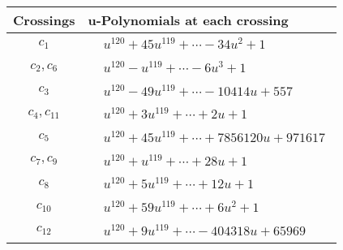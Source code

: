 \documentclass[1p]{elsarticle_modified}
\theoremstyle{definition}
\begin{document}
\begin{tabular}{m{50pt}|m{274pt}}
Crossings & \hspace{64pt}u-Polynomials at each crossing \\
\hline $$\begin{aligned}c_{1}\end{aligned}$$&$\begin{aligned}
&u^{120}+45 u^{119}+\cdots-34 u^2+1
\end{aligned}$\\
\hline $$\begin{aligned}c_{2},c_{6}\end{aligned}$$&$\begin{aligned}
&u^{120}- u^{119}+\cdots-6 u^3+1
\end{aligned}$\\
\hline $$\begin{aligned}c_{3}\end{aligned}$$&$\begin{aligned}
&u^{120}-49 u^{119}+\cdots-10414 u+557
\end{aligned}$\\
\hline $$\begin{aligned}c_{4},c_{11}\end{aligned}$$&$\begin{aligned}
&u^{120}+3 u^{119}+\cdots+2 u+1
\end{aligned}$\\
\hline $$\begin{aligned}c_{5}\end{aligned}$$&$\begin{aligned}
&u^{120}+45 u^{119}+\cdots+7856120 u+971617
\end{aligned}$\\
\hline $$\begin{aligned}c_{7},c_{9}\end{aligned}$$&$\begin{aligned}
&u^{120}+u^{119}+\cdots+28 u+1
\end{aligned}$\\
\hline $$\begin{aligned}c_{8}\end{aligned}$$&$\begin{aligned}
&u^{120}+5 u^{119}+\cdots+12 u+1
\end{aligned}$\\
\hline $$\begin{aligned}c_{10}\end{aligned}$$&$\begin{aligned}
&u^{120}+59 u^{119}+\cdots+6 u^2+1
\end{aligned}$\\
\hline $$\begin{aligned}c_{12}\end{aligned}$$&$\begin{aligned}
&u^{120}+9 u^{119}+\cdots-404318 u+65969
\end{aligned}$\\
\hline
\end{tabular}\\~\\
\end{document}
